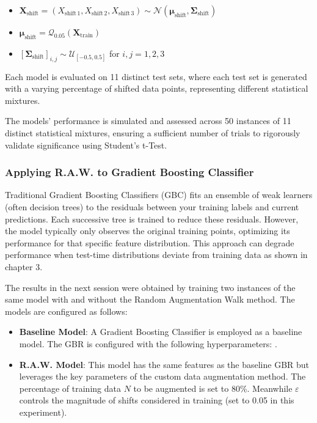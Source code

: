 \begin{itemize}
    \item $ \boldsymbol{X}_{\text{shift}} = (X_{\text{shift}\,1}, X_{\text{shift}\,2}, X_{\text{shift}\,3}) \sim \mathcal{N}(\boldsymbol{\mu}_{\text{shift}}, \boldsymbol{\Sigma}_{\text{shift}}) $
    \item $ \boldsymbol{\mu}_{\text{shift}} = \mathcal{Q}_{0.05}(\boldsymbol{X}_{\text{train}})$
    \item $ [\boldsymbol{\Sigma}_{\text{shift}}]_{i,j} \sim \mathcal{U}_{[-0.5,0.5]} $ for $ i, j = 1, 2, 3 $
\end{itemize}
Each model is evaluated on 11 distinct test sets, where each test set is generated with a varying percentage of shifted data points, representing different statistical mixtures.

The models' performance is simulated and assessed across 50 instances of 11 distinct statistical mixtures, ensuring a sufficient number of trials to rigorously validate significance using Student's t-Test.

\subsubsection{Applying R.A.W. to Gradient Boosting Classifier}

Traditional Gradient Boosting Classifiers (GBC) fits an ensemble of weak learners (often decision trees) to the residuals between your training labels and current predictions. Each successive tree is trained to reduce these residuals. However, the model typically only observes the original training points, optimizing its performance for that specific feature distribution. This approach can degrade performance when test-time distributions deviate from training data as shown in chapter 3. 

The results in the next session were obtained by training two instances of the same model with and without the Random Augmentation Walk method. The models are configured as follows:
\begin{itemize}
    \item \textbf{Baseline Model}: A Gradient Boosting Classifier is employed as a baseline model. The GBR is configured with the following hyperparameters: .
    \item \textbf{R.A.W. Model}: This model has the same features as the baseline GBR but leverages the key parameters of the custom data augmentation method. The percentage of training data $N$ to be augmented is set to 80\%. Meanwhile $\varepsilon$ controls the magnitude of shifts considered in training (set to 0.05 in this experiment).
\end{itemize}






